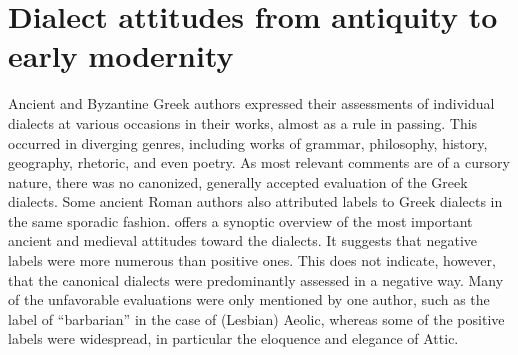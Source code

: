 \section{Dialect attitudes from antiquity to early modernity}

Ancient and Byzantine Greek authors expressed their assessments of individual dialects at various occasions in their works, almost as a rule in passing. This occurred in diverging genres, including works of grammar, philosophy, history, geography, rhetoric, and even poetry. As most relevant comments are of a cursory nature, there was no canonized, generally accepted evaluation of the Greek dialects. Some ancient Roman authors also attributed labels to Greek dialects in the same sporadic fashion.  offers a synoptic overview of the most important ancient and medieval attitudes toward the dialects. It suggests that negative labels were more numerous than positive ones. This does not indicate, however, that the canonical dialects were predominantly assessed in a negative way. Many of the unfavorable evaluations were only mentioned by one author, such as the label of “barbarian” in the case of (Lesbian) Aeolic, whereas some of the positive labels were widespread, in particular the eloquence and elegance of Attic.

